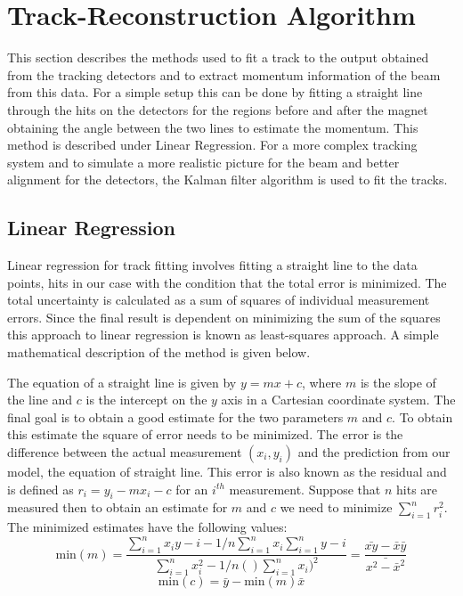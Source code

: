 \section{Track-Reconstruction Algorithm}
This section describes the methods used to fit a track to the output obtained from the tracking detectors and to extract momentum information of the beam from this data. For a simple setup this can be done by fitting a straight line through the hits on the detectors for the regions before and after the magnet obtaining the angle between the two lines to estimate the momentum. This method is described under Linear Regression. For a more complex tracking system and to simulate a more realistic picture for the beam and better alignment for the detectors, the Kalman filter algorithm is used to fit the tracks.

\subsection{Linear Regression}
\label{sec:Linear_Regression}
Linear regression for track fitting involves fitting a straight line to the data points, hits in our case with the condition that the total error is minimized. The total uncertainty is calculated as a sum of squares of individual measurement errors. Since the final result is dependent on minimizing the sum of the squares this approach to linear regression is known as least-squares approach. A simple mathematical description of the method is given below.

The equation of a straight line is given by $y=mx + c$, where $m$ is the slope of the line and $c$ is the intercept on the $y$ axis in a Cartesian coordinate system. The final goal is to obtain a good estimate for the two parameters $m$ and $c$. To obtain this estimate the square of error needs to be minimized. The error is the difference between the actual measurement $(x_i,y_i)$ and the prediction from our model, the equation of straight line. This error is also known as the residual and is defined as $r_i = y_i - m x_i - c $ for an $i^{th}$ measurement. Suppose that $n$ hits are measured then to obtain an estimate for $m$ and $c$ we need to minimize $\sum_{i=1}^n r_i^2$. The minimized estimates have the following values:
\begin{equation}
      \text{min}(m) = \frac{\sum_{i=1}^n x_i y-i - 1/n \sum_{i=1}^n x_i \sum_{i=1}^n y-i}{\sum_{i=1}^n x_i^2 - 1/n ()\sum_{i=1}^n x_i)^2}  = \frac{\bar{xy} - \bar{x}\bar{y}}{\bar{x^2-\bar{x}^2}}
\end{equation}
\begin{equation}
      \text{min}(c) = \bar{y} - \text{min}(m) \bar{x}
\end{equation}

